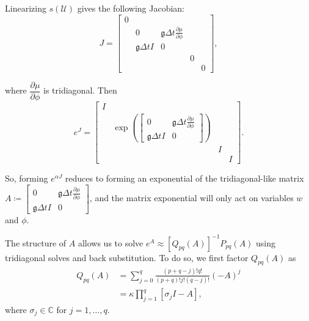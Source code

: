 \documentclass{csri19}
\newcommand{\CFKg}{\mathfrak{g}}
\newcommand{\CFKU}{\mathcal{U}}
\begin{document}
Linearizing $s(\CFKU)$ gives the following Jacobian:
\[ J = \begin{bmatrix}
0&                  &                                                   &  & \\
 & 0                & \CFKg \Delta t \frac{\partial \mu}{\partial \phi} &  & \\
 & \CFKg \Delta t I & 0                                                 &  & \\
 &                  &                                                   &0 & \\
 &                  &                                                   &  &0\end{bmatrix},\]

where $\dfrac{\partial \mu}{\partial \phi}$ is tridiagonal. Then
\[ e^J = \begin{bmatrix}
I&                                                                     &  & \\
 & \exp\left(\begin{bmatrix}0 & \CFKg \Delta t \frac{\partial \mu}{\partial \phi} \\ 
  \CFKg \Delta t I & 0     \end{bmatrix}\right)     &  & \\                                      
 &                                                                     &I & \\
 &                                                                     &  &I\end{bmatrix}.\]

So, forming $e^{\alpha J}$ reduces to forming an exponential of the 
tridiagonal-like matrix $A \coloneqq 
\begin{bmatrix}
   0              & \CFKg \Delta t \frac{\partial \mu}{\partial \phi} \\
 \CFKg \Delta t I & 0  \end{bmatrix}$, and the matrix exponential will 
only act on variables $w$ and $\phi$. 

The structure of $A$ allows us to solve 
$e^A \approx \left[Q_{pq}(A)\right]^{-1}P_{pq}(A)$ using tridiagonal solves 
and back substitution. To do so, we first factor $Q_{pq}(A)$ as
\begin{align*}
Q_{pq}(A) &= \sum_{j=0}^q\frac{(p+q-j)!q!}{(p+q)!j!(q-j)!}(-A)^j\\
          &= \kappa\prod_{j=1}^q\left[\sigma_jI-A\right],
\end{align*}
where $\sigma_j\in \mathbb{C}$ for $j=1,\dots,q$.
\end{document}

